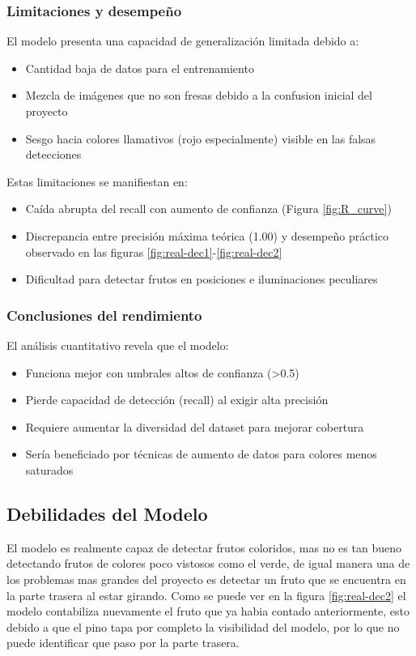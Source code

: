 \documentclass[conference]{IEEEtran}
\begin{document}
\subsubsection{Limitaciones y desempeño}
El modelo presenta una capacidad de generalización limitada debido a:
\begin{itemize}
\item Cantidad baja de datos para el entrenamiento
\item Mezcla de imágenes que no son fresas debido a la confusion inicial del proyecto
\item Sesgo hacia colores llamativos (rojo especialmente) visible en las falsas detecciones
\end{itemize}

Estas limitaciones se manifiestan en:
\begin{itemize}
\item Caída abrupta del recall con aumento de confianza (Figura \ref{fig:R_curve})
\item Discrepancia entre precisión máxima teórica (1.00) y desempeño práctico observado en las figuras \ref{fig:real-dec1}-\ref{fig:real-dec2}
\item Dificultad para detectar frutos en posiciones e iluminaciones peculiares
\end{itemize}

\subsubsection{Conclusiones del rendimiento}
El análisis cuantitativo revela que el modelo:
\begin{itemize}
\item Funciona mejor con umbrales altos de confianza (>0.5)
\item Pierde capacidad de detección (recall) al exigir alta precisión
\item Requiere aumentar la diversidad del dataset para mejorar cobertura
\item Sería beneficiado por técnicas de aumento de datos para colores menos saturados
\end{itemize}



\subsection{Debilidades del Modelo}
El modelo es realmente capaz de detectar frutos coloridos, mas no es tan bueno detectando frutos de colores poco vistosos como el verde, de igual manera una de los problemas mas grandes del proyecto es detectar un fruto que se encuentra en la parte trasera al estar girando. Como se puede ver en la figura \ref{fig:real-dec2} el modelo contabiliza nuevamente el fruto que ya habia contado anteriormente, esto debido a que el pino tapa por completo la visibilidad del modelo, por lo que no puede identificar que paso por la parte trasera.
\end{document}

